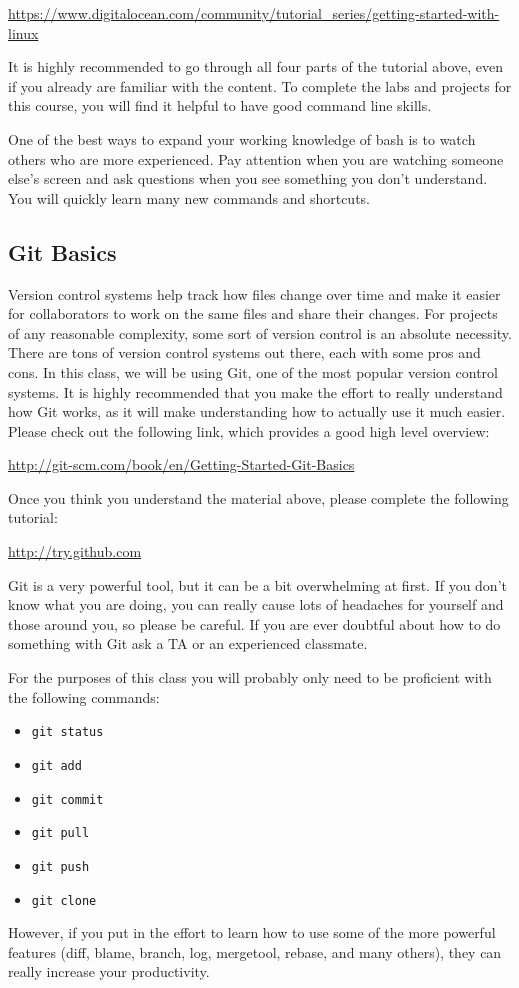 \documentclass[11pt]{article}
\begin{document}
\url{https://www.digitalocean.com/community/tutorial_series/getting-started-with-linux}

It is highly recommended to go through all four parts of the tutorial above, even if you already are familiar with the content. To complete the labs and projects for this course, you will find it helpful to have good command line skills.

One of the best ways to expand your working knowledge of bash is to watch others who are more experienced. Pay attention when you are watching someone else's screen and ask questions when you see something you don't understand. You will quickly learn many new commands and shortcuts.

\subsection{Git Basics}
Version control systems help track how files change over time and make it easier for collaborators to work on the same files and share their changes. For projects of any reasonable complexity, some sort of version control is an absolute necessity. There are tons of version control systems out there, each with some pros and cons. In this class, we will be using Git, one of the most popular version control systems. It is highly recommended that you make the effort to really understand how Git works, as it will make understanding how to actually use it much easier. Please check out the following link, which provides a good high level overview:

\url{http://git-scm.com/book/en/Getting-Started-Git-Basics}

Once you think you understand the material above, please complete the following tutorial:

\url{http://try.github.com}

Git is a very powerful tool, but it can be a bit overwhelming at first. If you don't know what you are doing, you can really cause lots of headaches for yourself and those around you, so please be careful. If you are ever doubtful about how to do something with Git ask a TA or an experienced classmate.

For the purposes of this class you will probably only need to be proficient with the following commands:
\begin{itemize}
\item {\tt git status}
\item {\tt git add}
\item {\tt git commit}
\item {\tt git pull}
\item {\tt git push}
\item {\tt git clone}
\end{itemize}
However, if you put in the effort to learn how to use some of the more powerful features (diff, blame, branch, log, mergetool, rebase, and many others), they can really increase your productivity.
\end{document}
